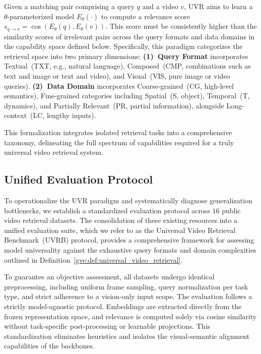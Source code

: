 \begin{definition}\label{gve:def:universal_video_retrieval}
    Given a matching pair comprising a query $q$ and a video $v$, UVR aims to learn a $\theta$-parameterized model $E_\theta(\cdot)$ to compute a relevance score $s_{q \to v} = \cos(E_\theta(q), E_\theta(v))$. This score must be consistently higher than the similarity scores of irrelevant pairs across the query formats and data domains in the capability space defined below.
    Specifically, this paradigm categorizes the retrieval space into two primary dimensions:
    \textbf{(1)~Query Format} incorporates Textual~(TXT, e.g., natural language), Composed~(CMP, combinations such as text and image or text and video), and Visual~(VIS, pure image or video queries).
    \textbf{(2)~Data Domain} incorporates Coarse-grained~(CG, high-level semantics), Fine-grained categories including Spatial~(S, object), Temporal~(T, dynamics), and Partially Relevant~(PR, partial information), alongside Long-context~(LC, lengthy inputs).
\end{definition}

This formalization integrates isolated retrieval tasks into a comprehensive taxonomy, delineating the full spectrum of capabilities required for a truly universal video retrieval system.

\subsection{Unified Evaluation Protocol}

To operationalize the UVR paradigm and systematically diagnose generalization bottlenecks, we establish a standardized evaluation protocol across $16$ public video retrieval datasets. The consolidation of these existing resources into a unified evaluation suite, which we refer to as the Universal Video Retrieval Benchmark~(UVRB) protocol, provides a comprehensive framework for assessing model universality against the exhaustive query formats and domain complexities outlined in Definition~\ref{gve:def:universal_video_retrieval}.

To guarantee an objective assessment, all datasets undergo identical preprocessing, including uniform frame sampling, query normalization per task type, and strict adherence to a vision-only input scope. The evaluation follows a strictly model-agnostic protocol. Embeddings are extracted directly from the frozen representation space, and relevance is computed solely via cosine similarity without task-specific post-processing or learnable projections. This standardization eliminates heuristics and isolates the visual-semantic alignment capabilities of the backbones.


